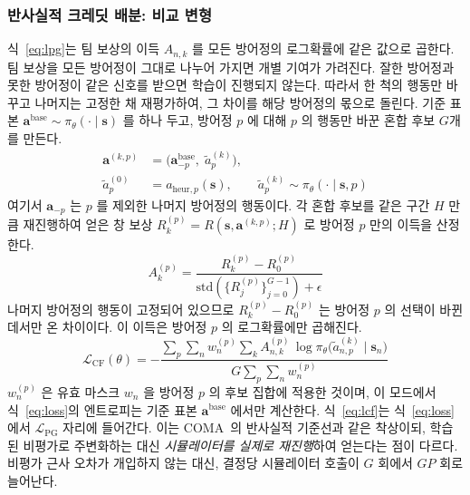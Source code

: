 \subsubsection{반사실적 크레딧 배분: 비교 변형}

식~\eqref{eq:lpg}는 팀 보상의 이득 $A_{n,k}$ 를 모든 방어정의 로그확률에 같은 값으로
곱한다. 팀 보상을 모든 방어정이 그대로 나누어 가지면 개별 기여가 가려진다. 잘한 방어정과 못한
방어정이 같은 신호를 받으면 학습이 진행되지 않는다. 따라서 한 척의 행동만 바꾸고 나머지는
고정한 채 재평가하여, 그 차이를 해당 방어정의 몫으로 돌린다. 기준 표본
$\mathbf{a}^{\mathrm{base}} \sim \pi_\theta(\cdot \mid \mathbf{s})$ 를 하나 두고, 방어정 $p$ 에
대해 $p$ 의 행동만 바꾼 혼합 후보 $G$개를 만든다.
\begin{equation}
\begin{aligned}
\mathbf{a}^{(k, p)} &= \big(\mathbf{a}^{\mathrm{base}}_{-p},\; \tilde{a}^{(k)}_p\big),\\
\tilde{a}^{(0)}_p &= a_{\mathrm{heur},p}(\mathbf{s}), \qquad
\tilde{a}^{(k)}_p \sim \pi_\theta(\cdot \mid \mathbf{s}, p)
\end{aligned}
\label{eq:cfmix}
\end{equation}
여기서 $\mathbf{a}_{-p}$ 는 $p$ 를 제외한 나머지 방어정의 행동이다. 각 혼합 후보를 같은 구간
$H$ 만큼 재진행하여 얻은 창 보상 $R^{(p)}_k = R(\mathbf{s}, \mathbf{a}^{(k,p)}; H)$ 로 방어정
$p$ 만의 이득을 산정한다.
\begin{equation}
A^{(p)}_k = \frac{R^{(p)}_k - R^{(p)}_0}{\mathrm{std}(\{R^{(p)}_j\}_{j=0}^{G-1}) + \epsilon}
\label{eq:cfadv}
\end{equation}
나머지 방어정의 행동이 고정되어 있으므로 $R^{(p)}_k - R^{(p)}_0$ 는 방어정 $p$ 의 선택이
바뀐 데서만 온 차이이다. 이 이득은 방어정 $p$ 의 로그확률에만 곱해진다.
\begin{equation}
\mathcal{L}_{\mathrm{CF}}(\theta) = -\frac{\sum_{p} \sum_{n} w^{(p)}_n \sum_{k} A^{(p)}_{n,k}\,
  \log \pi_\theta\big(\tilde{a}^{(k)}_{n,p} \mid \mathbf{s}_n\big)}{G \sum_{p} \sum_n w^{(p)}_n}
\label{eq:lcf}
\end{equation}
$w^{(p)}_n$ 은 유효 마스크 $w_n$ 을 방어정 $p$ 의 후보 집합에 적용한 것이며, 이 모드에서
식~\eqref{eq:loss}의 엔트로피는 기준 표본 $\mathbf{a}^{\mathrm{base}}$ 에서만 계산한다.
식~\eqref{eq:lcf}는 식~\eqref{eq:loss}에서 $\mathcal{L}_{\mathrm{PG}}$ 자리에 들어간다. 이는
COMA~\citep{foerster2018coma}의 반사실적 기준선과 같은 착상이되, 학습된 비평가로 주변화하는
대신 \emph{시뮬레이터를 실제로 재진행}하여 얻는다는 점이 다르다. 비평가 근사 오차가 개입하지
않는 대신, 결정당 시뮬레이터 호출이 $G$ 회에서 $G P$ 회로 늘어난다.

